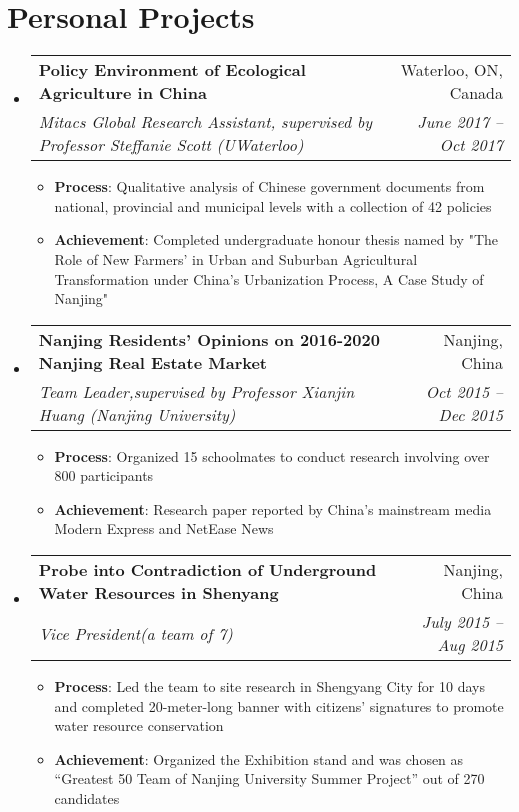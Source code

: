 \documentclass[letterpaper,11pt]{article}
\makeatletter
\newcommand{\resumeItem}[2]{
  \item\small{
    \textbf{#1}{: #2 \vspace{-2pt}}
  }
}
\newcommand{\resumeSubheading}[4]{
  \vspace{-1pt}\item
    \begin{tabular*}{0.97\textwidth}{l@{\extracolsep{\fill}}r}
      \textbf{#1} & #2 \\
      \textit{\small#3} & \textit{\small #4} \\
    \end{tabular*}\vspace{-5pt}
}
\newcommand{\resumeSubItem}[2]{\resumeItem{#1}{#2}\vspace{-4pt}}
\newcommand{\resumeSubHeadingListStart}{\begin{itemize}[leftmargin=*]}
\newcommand{\resumeSubHeadingListEnd}{\end{itemize}}
\newcommand{\resumeItemListStart}{\begin{itemize}}
\newcommand{\resumeItemListEnd}{\end{itemize}\vspace{-5pt}}
\makeatother
\begin{document}
\section{Personal Projects}
  \resumeSubHeadingListStart
         \resumeSubheading
      {Policy Environment of Ecological Agriculture in China}{Waterloo, ON, Canada}
      {Mitacs Global Research Assistant, supervised by Professor Steffanie Scott (UWaterloo)}{June 2017 -- Oct 2017}
      \resumeItemListStart
          \resumeItem{Process}
          {Qualitative analysis of Chinese government documents from national, provincial and municipal levels with a collection of 42 policies} 
             \resumeItem{Achievement}
          {Completed undergraduate honour thesis named by "The Role of New Farmers' in Urban and Suburban Agricultural Transformation under China's Urbanization Process, A Case Study of Nanjing"}
      \resumeItemListEnd
      
    \resumeSubheading
      {Nanjing Residents' Opinions on 2016-2020 Nanjing Real Estate Market}{Nanjing, China}
      {Team Leader,supervised by Professor Xianjin Huang (Nanjing University)}{Oct 2015 -- Dec 2015}
      \resumeItemListStart
        \resumeItem{Process}
          {Organized 15 schoolmates to conduct research involving over 800 participants}
          \resumeItem{Achievement}
          {Research paper reported by China’s mainstream media Modern Express and NetEase News} 
      \resumeItemListEnd

         \resumeSubheading
      {Probe into Contradiction of Underground Water Resources in Shenyang }{Nanjing, China}
      {Vice President(a team of 7)}{July 2015 -- Aug 2015}
      \resumeItemListStart
          \resumeItem{Process}
          {Led the team to site research in Shengyang City for 10 days and completed 20-meter-long banner with citizens' signatures to promote water resource conservation} 
             \resumeItem{Achievement}
          {Organized the Exhibition stand and was chosen as “Greatest 50 Team of Nanjing University Summer Project” out of 270 candidates }
      \resumeItemListEnd
      

        \resumeSubHeadingListEnd




\end{document}
